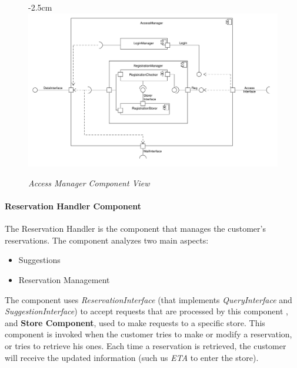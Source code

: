 \documentclass{article}
\begin{document}
				\begin{figure}[h]
					\begin{adjustwidth} {-2.5cm}{}
						\centering
						\includegraphics[scale=0.45]{Component Diagrams/AccessManagerComponentView.pdf}\\
					\end{adjustwidth}
					\caption{\emph{Access Manager Component View}}
				\end{figure}
				\newpage
				
			\paragraph{Reservation Handler Component}
				The Reservation Handler is the component that manages the customer’s reservations. The component analyzes two main aspects:
				
				\begin{itemize}
					\item Suggestions
					\item Reservation Management
				\end{itemize}
			
				The component uses \emph{ReservationInterface} (that implements \emph{QueryInterface} and \emph{SuggestionInterface}) to accept requests that are processed by this component , and {\bfseries Store Component}, used to make requests to a specific store.
				This component is invoked when the customer tries to make or modify a reservation, or tries to retrieve his ones. Each time a reservation is retrieved, the customer will receive the updated information (such us \emph{ETA} to enter the store).
				
\end{document}
